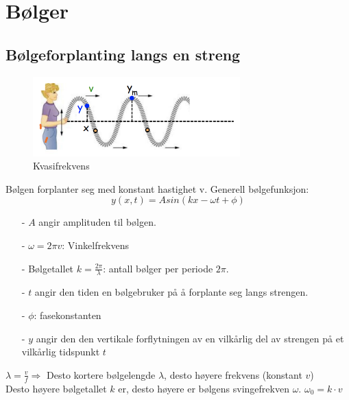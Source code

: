 \documentclass[12pt]{article}
\begin{document}
\section{Bølger}
\subsection{Bølgeforplanting langs en streng}
\begin{figure} [H]
    \centering
    \includegraphics[width = 8cm]{images/waves.png}
    \caption{Kvasifrekvens}
\end{figure}
Bølgen forplanter seg med konstant hastighet v.
Generell bølgefunksjon:
$$y(x,t) = A sin(kx-\omega t + \phi)$$
\begin{itemize}
    \item[-] $A$ angir amplituden til bølgen.
    \item[-] $\omega = 2\pi v$: Vinkelfrekvens
    \item[-] Bølgetallet $k = \frac{2\pi}{\lambda}$: antall bølger per periode $2 \pi$. 
    \item[-] $t$ angir den tiden en bølgebruker på å forplante seg langs strengen.
    \item[-] $\phi$: fasekonstanten
    \item[-] $y$ angir den den vertikale forflytningen av en vilkårlig del av strengen på et vilkårlig tidspunkt $t$
\end{itemize}
$\lambda = \frac{v}{f} \Rightarrow$ Desto kortere bølgelengde $\lambda$, desto høyere frekvens (konstant $v$)\\
Desto høyere bølgetallet $k$ er, desto høyere er bølgens svingefrekven $\omega$. $\omega_0 = k\cdot v$
\end{document}
